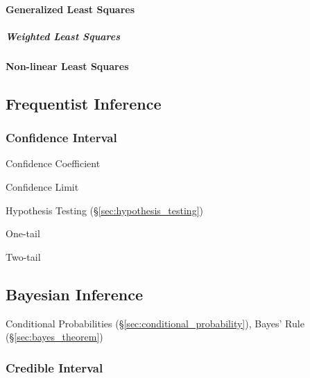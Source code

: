 \paragraph{Generalized Least Squares}\label{sec:generalized_least_squares}\hfill

\subparagraph{Weighted Least Squares}\label{sec:weighted_least_squares}\hfill



\paragraph{Non-linear Least Squares}\label{sec:nonlinear_least_squares}\hfill



\subsection{Frequentist Inference}\label{sec:frequentist_inference}

\subsubsection{Confidence Interval}\label{sec:confidence_interval}

Confidence Coefficient

Confidence Limit

Hypothesis Testing (\S\ref{sec:hypothesis_testing})

One-tail

Two-tail



\subsection{Bayesian Inference}\label{sec:bayesian_inference}

Conditional Probabilities (\S\ref{sec:conditional_probability}), Bayes' Rule
(\S\ref{sec:bayes_theorem})



\subsubsection{Credible Interval}\label{sec:credible_interval}

